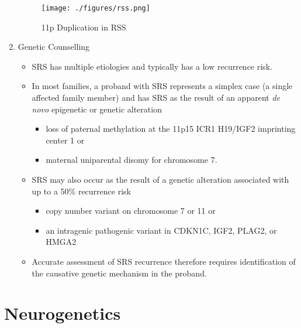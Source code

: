 \documentclass[12pt]{scrartcl}
\begin{document}
\begin{enumerate}
\begin{figure}[htbp]
\centering
\texttt{[image: ./figures/rss.png]}
\caption{\label{fig:org9f96c0d}11p Duplication in RSS}
\end{figure}

\item Genetic Counselling
\label{sec:orgffb7619}
\begin{itemize}
\item SRS has multiple etiologies and typically has a low recurrence
risk.
\item In most families, a proband with SRS represents a simplex case (a single affected family member) and has
SRS as the result of an apparent \emph{de novo} epigenetic or genetic alteration
\begin{itemize}
\item loss of paternal methylation at the 11p15 ICR1 H19/IGF2 imprinting center 1 or
\item maternal uniparental disomy for chromosome 7.
\end{itemize}
\item SRS may also occur as the result of a genetic alteration associated with up to a 50\% recurrence risk
\begin{itemize}
\item copy number variant on chromosome 7 or 11 or
\item an intragenic pathogenic  variant in CDKN1C, IGF2, PLAG2, or HMGA2
\end{itemize}
\item Accurate assessment of SRS recurrence therefore requires
identification of the causative genetic mechanism in the proband.
\end{itemize}
\end{enumerate}

\section{Neurogenetics}
\label{sec:org4276f63}
\end{document}
